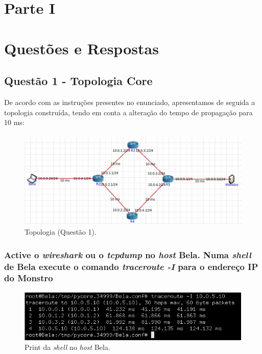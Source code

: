 \section*{\hfil Parte I\hfil}
\section{Questões e Respostas}
\subsection{Questão 1 - Topologia Core}
De acordo com as instruções presentes no enunciado, apresentamos de seguida 
a topologia construída, tendo em conta a alteração do tempo de propagação para
10 ms:

\paragraph{}
\begin{figure}[H]
\centering
\includegraphics[width=500pt]{images/ParteI/Questao1/questao1-topologia.jpg}
\caption{Topologia (Questão 1).} \label{topologia}
\end{figure}


\paragraph{}
\subsubsection{Active o \textit{wireshark} ou o \textit{tcpdump} no \textit{host} Bela. Numa \textit{shell} de Bela execute o comando \textit{traceroute -I} para o endereço IP do Monstro}

\begin{figure}[H]
\centering
\includegraphics[width=400pt]{images/ParteI/Questao1/questao1-a.jpg}
\caption{Print da \textit{shell} no \textit{host} Bela.} \label{questao1-a}
\end{figure}

